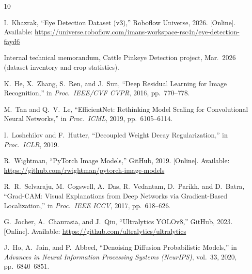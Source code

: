 \documentclass[10pt,journal,compsoc]{IEEEtran}
\begin{document}

\begin{thebibliography}{10}

I.\ Khazrak,
``Eye Detection Dataset (v3),''
Roboflow Universe, 2026.
[Online]. Available: \url{https://universe.roboflow.com/imans-workspace-rsc4n/eye-detection-fayd6}

Internal technical memorandum, Cattle Pinkeye Detection project,
Mar.\ 2026 (dataset inventory and crop statistics).

K.\ He, X.\ Zhang, S.\ Ren, and J.\ Sun,
``Deep Residual Learning for Image Recognition,''
in \emph{Proc.\ IEEE/CVF CVPR}, 2016, pp.\ 770--778.

M.\ Tan and Q.\ V.\ Le,
``EfficientNet: Rethinking Model Scaling for Convolutional Neural Networks,''
in \emph{Proc.\ ICML}, 2019, pp.\ 6105--6114.

I.\ Loshchilov and F.\ Hutter,
``Decoupled Weight Decay Regularization,''
in \emph{Proc.\ ICLR}, 2019.

R.\ Wightman,
``PyTorch Image Models,''
GitHub, 2019.
[Online]. Available: \url{https://github.com/rwightman/pytorch-image-models}

R.\ R.\ Selvaraju, M.\ Cogswell, A.\ Das, R.\ Vedantam, D.\ Parikh,
and D.\ Batra,
``Grad-CAM: Visual Explanations from Deep Networks via
Gradient-Based Localization,''
in \emph{Proc.\ IEEE ICCV}, 2017, pp.\ 618--626.

G.\ Jocher, A.\ Chaurasia, and J.\ Qiu,
``Ultralytics YOLOv8,''
GitHub, 2023.
[Online]. Available: \url{https://github.com/ultralytics/ultralytics}

J.\ Ho, A.\ Jain, and P.\ Abbeel,
``Denoising Diffusion Probabilistic Models,''
in \emph{Advances in Neural Information Processing Systems (NeurIPS)},
vol.\ 33, 2020, pp.\ 6840--6851.

\end{thebibliography}
\end{document}
